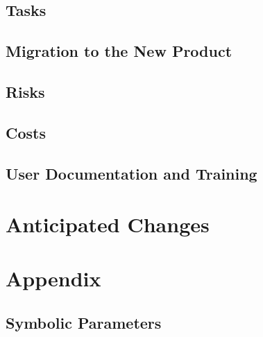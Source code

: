 \documentclass[11pt]{article}
\begin{document}
\subsection{Tasks}

\subsection{Migration to the New Product}

\subsection{Risks}

\subsection{Costs}

\subsection{User Documentation and Training}

\section{Anticipated Changes}

\section{Appendix}

\subsection{Symbolic Parameters}
\end{document}

